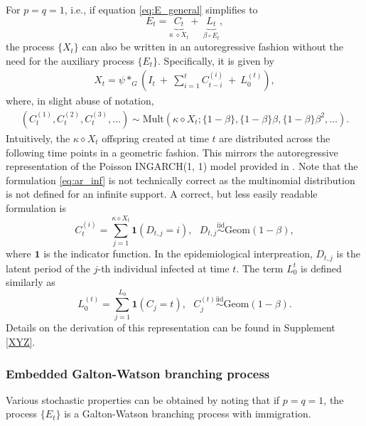 \documentclass{article}
\begin{document}
For $p = q = 1$, i.e., if equation \eqref{eq:E_general}  simplifies to
$$
E_t = \underbrace{C_t}_{\kappa \ \diamond X_t} + \ \underbrace{L_t}_{\beta \circ E_t},
$$
the process $\{X_t\}$ can also be written in an autoregressive fashion without the need for the auxiliary process $\{E_t\}$. Specifically, it is given by
\begin{align*}
X_t = \psi *_G \left(I_t \ + \ \sum_{i = 1}^t C_{t - i}^{(i)}  \ + \ L_0^{(t)}\right),
\end{align*}
where, in slight abuse of notation,
\begin{align}
(C_t^{(1)}, C_t^{(2)}, C_t^{(3)}, \dots) \sim \text{Mult}(\kappa \diamond X_{t}; \{1- \beta\}, \{1 - \beta\}\beta, \{1 - \beta\}\beta^2, \dots).\label{eq:ar_inf}
\end{align}
Intuitively, the $\kappa \diamond X_t$ offspring created at time $t$ are distributed across the following time points in a geometric fashion. This mirrors the autoregressive representation of the Poisson INGARCH(1, 1) model provided in \cite{Fokianos2016}. Note that the formulation \eqref{eq:ar_inf} is not technically correct as the multinomial distribution is not defined for an infinite support. A correct, but less easily readable formulation is
$$
C_t^{(i)} = \sum_{j = 1}^{\kappa \diamond X_t} \mathbf{1}(D_{t, j} = i), \ \ \ D_{t, j} \stackrel{\text{iid}}{\sim} \text{Geom}(1 - \beta),
$$
where $\mathbf{1}$ is the indicator function. In the epidemiological interpreation, $D_{t, j}$ is the latent period of the $j$-th individual infected at time $t$. The term $L_0^{t}$ is defined similarly as
$$
L_0^{(t)} = \sum_{j = 1}^{L_0} \mathbf{1}(C_j = t), \ \ \ C_{j}^{(t)} \stackrel{\text{iid}}{\sim} \text{Geom}(1 - \beta).
$$
Details on the derivation of this representation can be found in Supplement \ref{XYZ}.

\subsubsection{Embedded Galton-Watson branching process}
\label{subsec:embedded_galton_watson}

Various stochastic properties can be obtained by noting that if $p = q = 1$, the process $\{E_t\}$ is a Galton-Watson branching process with immigration. 
\end{document}

